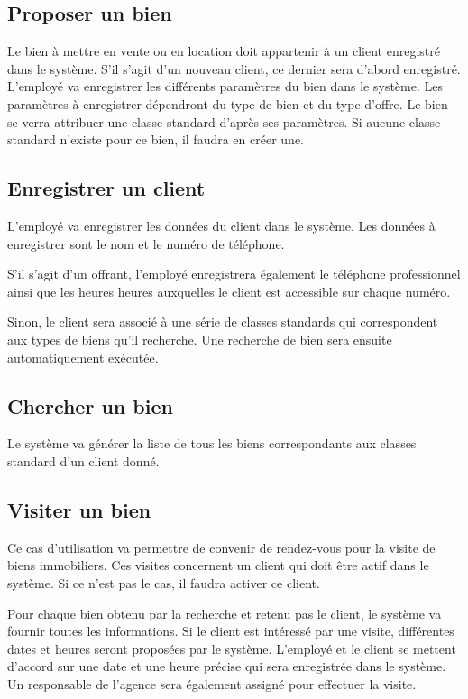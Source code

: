\subsection{Proposer un bien}

Le bien à mettre en vente ou en location doit appartenir à un client enregistré dans le système. S'il s'agit d'un nouveau client, ce dernier sera d'abord enregistré. L'employé va enregistrer les différents paramètres du bien dans le système. Les paramètres à enregistrer dépendront du type de bien et du type d'offre. Le bien se verra attribuer une classe standard d'après ses paramètres. Si aucune classe standard n'existe pour ce bien, il faudra en créer une.

\subsection{Enregistrer un client}

L'employé va enregistrer les données du client dans le système. Les données à enregistrer sont le nom et le numéro de téléphone.

S'il s'agit d'un offrant, l'employé enregistrera également le téléphone professionnel ainsi que les heures heures auxquelles le client est accessible sur chaque numéro.

Sinon, le client sera associé à une série de classes standards qui correspondent aux types de biens qu'il recherche. Une recherche de bien sera ensuite automatiquement exécutée.

\subsection{Chercher un bien}

Le système va générer la liste de tous les biens correspondants aux classes standard d'un client donné.

\subsection{Visiter un bien}

Ce cas d'utilisation va permettre de convenir de rendez-vous pour la visite de biens immobiliers. Ces visites concernent un client qui doit être actif dans le système. Si ce n'est pas le cas, il faudra activer ce client.

Pour chaque bien obtenu par la recherche et retenu pas le client, le système va fournir toutes les informations. Si le client est intéressé par une visite, différentes dates et heures seront proposées par le système. L'employé et le client se mettent d'accord sur une date et une heure précise qui sera enregistrée dans le système. Un responsable de l'agence sera également assigné pour effectuer la visite.

